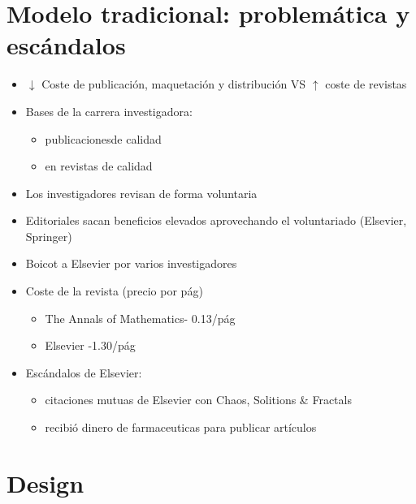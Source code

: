 \documentclass[a0,portrait]{a0poster}
\begin{document}
\begin{multicols}{2}
  \section*{Modelo tradicional: problemática y escándalos}
  \begin{itemize}
  \item $\downarrow$ Coste de publicación, maquetación y distribución VS $\uparrow$ coste de revistas
  \item Bases de la carrera investigadora:
    \begin{itemize}
    \item publicacionesde calidad 
    \item en revistas de calidad
    \end{itemize}
  \item Los investigadores revisan de forma voluntaria
  \item Editoriales sacan beneficios elevados aprovechando el voluntariado (Elsevier, Springer) 
  \item Boicot a Elsevier por varios investigadores
  \item Coste de la revista (precio por pág)
 \begin{itemize}
    \item The Annals of Mathematics- 0.13/pág
    \item Elsevier -1.30/pág
    \end{itemize}
  \item Escándalos de Elsevier:
    \begin{itemize}
  	\item citaciones mutuas de Elsevier con  Chaos, Solitions \& Fractals
  	\item recibió dinero de farmaceuticas para publicar artículos
  	\end{itemize}
  \end{itemize}
	

	 

  \section*{Design}
  \begin{center}\vspace{1cm}
  \end{center}%


\end{multicols}
\end{document}
